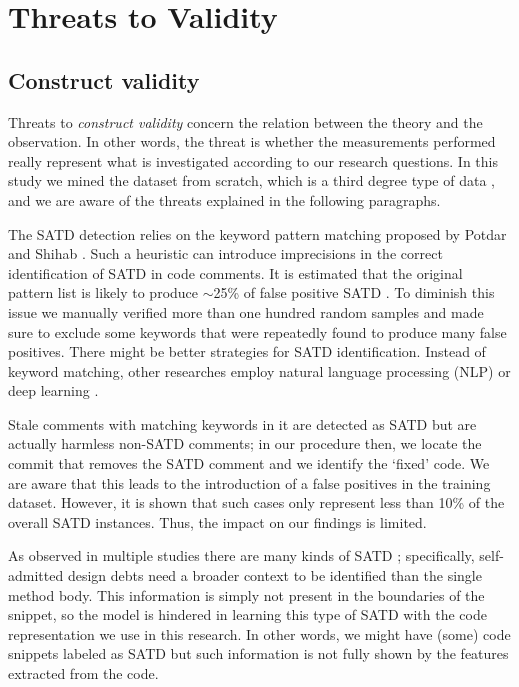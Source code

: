 \chapter{Threats to Validity}

\section{Construct validity}
Threats to \textit{construct validity} concern the relation between the theory and the observation. In other words, the threat is whether the measurements performed really represent what is investigated according to our research questions. In this study we mined the dataset from scratch, which is a third degree type of data \cite{runeson2009guidelines}, and we are aware of the threats explained in the following paragraphs. 

The SATD detection relies on the keyword pattern matching proposed by Potdar and Shihab \cite{potdar2014exploratory}. Such a heuristic can introduce imprecisions in the correct identification of SATD in code comments. It is estimated that the original pattern list is likely to produce $\sim$25\% of false positive SATD \cite{bavota2016large}. To diminish this issue we manually verified more than one hundred random samples and made sure to exclude some keywords that were repeatedly found to produce many false positives.
There might be better strategies for SATD identification. Instead of keyword matching, other researches employ natural language processing (NLP) \cite{maldonado2017using} or deep learning \cite{wang2020detecting}. 

Stale comments with matching keywords in it are detected as SATD but are actually harmless non-SATD comments; in our procedure then, we locate the commit that removes the SATD comment and we identify the `fixed' code. We are aware that this leads to the introduction of a false positives in the training dataset. However, it is shown \cite{bavota2016large} that such cases only represent less than 10\% of the overall SATD instances. Thus, the impact on our findings is limited.

As observed in multiple studies there are many kinds of SATD \cite{alves2014towards} \cite{maldonado2015detecting}; specifically, self-admitted design debts need a broader context to be identified than the single method body. This information is simply not present in the boundaries of the snippet, so the model is hindered in learning this type of SATD with the code representation we use in this research. In other words, we might have (some) code snippets labeled as SATD but such information is not fully shown by the features extracted from the code.

